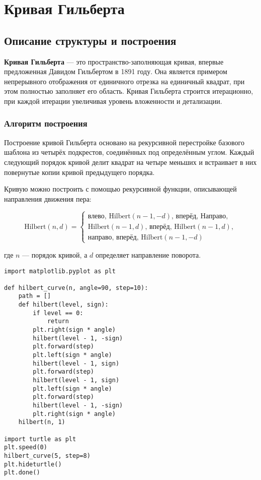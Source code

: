 \section{Кривая Гильберта}

\subsection{Описание структуры и построения}

\textbf{Кривая Гильберта} — это пространство-заполняющая кривая, впервые предложенная Давидом Гильбертом в 1891 году. Она является примером непрерывного отображения от единичного отрезка на единичный квадрат, при этом полностью заполняет его область. Кривая Гильберта строится итерационно, при каждой итерации увеличивая уровень вложенности и детализации.

\subsubsection{Алгоритм построения}

Построение кривой Гильберта основано на рекурсивной перестройке базового шаблона из четырёх подкрестов, соединённых под определённым углом. Каждый следующий порядок кривой делит квадрат на четыре меньших и встраивает в них повернутые копии кривой предыдущего порядка.

Кривую можно построить с помощью рекурсивной функции, описывающей направления движения пера:

\[
\text{Hilbert}(n, d) =
\begin{cases}
\text{влево},\, \text{Hilbert}(n-1, -d),\, \text{вперёд},\, \text{Направо}, \\
\text{Hilbert}(n-1, d),\, \text{вперёд},\, \text{Hilbert}(n-1, d), \\
\text{направо},\, \text{вперёд},\, \text{Hilbert}(n-1, -d)
\end{cases}
\]

где \( n \) — порядок кривой, а \( d \) определяет направление поворота.

\begin{lstlisting}[caption=Построение кривой Гильберта]
import matplotlib.pyplot as plt

def hilbert_curve(n, angle=90, step=10):
    path = []
    def hilbert(level, sign):
        if level == 0:
            return
        plt.right(sign * angle)
        hilbert(level - 1, -sign)
        plt.forward(step)
        plt.left(sign * angle)
        hilbert(level - 1, sign)
        plt.forward(step)
        hilbert(level - 1, sign)
        plt.left(sign * angle)
        plt.forward(step)
        hilbert(level - 1, -sign)
        plt.right(sign * angle)
    hilbert(n, 1)

import turtle as plt
plt.speed(0)
hilbert_curve(5, step=8)
plt.hideturtle()
plt.done()
\end{lstlisting}

